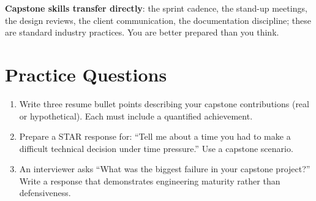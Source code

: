 \textbf{Capstone skills transfer directly}: the sprint cadence, the stand-up meetings, the design reviews, the client communication, the documentation discipline; these are standard industry practices. You are better prepared than you think.


\section{Practice Questions}
\begin{enumerate}[leftmargin=1.5em]
\item Write three resume bullet points describing your capstone contributions (real or hypothetical). Each must include a quantified achievement.
\item Prepare a STAR response for: ``Tell me about a time you had to make a difficult technical decision under time pressure.'' Use a capstone scenario.
\item An interviewer asks ``What was the biggest failure in your capstone project?'' Write a response that demonstrates engineering maturity rather than defensiveness.
\end{enumerate}


